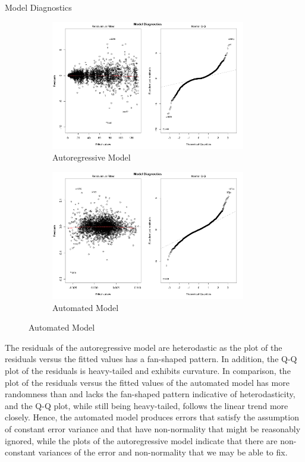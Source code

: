 \documentclass[]{article}
\begin{document}
\begin{section}{Model Diagnostics}
\begin{figure}[h]
\begin{subfigure}{.5\textwidth}
  \includegraphics[width=85mm]{diagnostics/arm_model_plots.png}
  \caption{Autoregressive Model}
\end{subfigure}%
\begin{subfigure}{.5\textwidth}
  \includegraphics[width=85mm]{diagnostics/fm_model_plots.png}
  \caption{Automated Model}
\end{subfigure}
\end{figure}

The residuals of the autoregressive model are heterodastic as the plot of the residuals versus the fitted values has a fan-shaped pattern. In addition, the Q-Q plot of the residuals is heavy-tailed and exhibits curvature. In comparison, the plot of the residuals versus the fitted values of the automated model has more randomness than and lacks the fan-shaped pattern indicative of heterodasticity, and the Q-Q plot, while still being heavy-tailed, follows the linear trend more closely. Hence, the automated model produces errors that satisfy the assumption of constant error variance and that have non-normality that might be reasonably ignored, while the plots of the autoregressive model indicate that there are non-constant variances of the error and non-normality that we may be able to fix.



\end{section}
\end{document}
